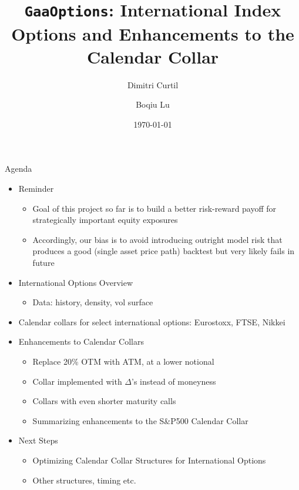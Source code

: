\documentclass{beamer}
\title[{\tt GaaOptions}]{{\tt GaaOptions}: International Index Options and Enhancements to the Calendar Collar}
\author[DC $|$ BL]{Dimitri Curtil  \and Boqiu Lu}
\date{\today}
\begin{document}
\begin{frame}
  \titlepage
\end{frame}

\begin{frame}{Agenda}
\begin{itemize}
\item Reminder
	\begin{itemize}
	\item Goal of this project so far is to build a better risk-reward payoff for strategically important equity exposures
	\item Accordingly, our bias is to avoid introducing outright model risk that produces a good (single asset price path) backtest but very likely fails in future
	\end{itemize}
\item International Options Overview
	\begin{itemize}
	\item Data: history, density, vol surface
	\end{itemize}
\item Calendar collars for select international options: Eurostoxx, FTSE, Nikkei
\item Enhancements to Calendar Collars
	\begin{itemize}
	\item Replace 20\% OTM with ATM, at a lower notional
	\item Collar implemented with $\Delta$'s instead of moneyness
	\item Collars with even shorter maturity calls
	\item Summarizing enhancements to the S\&P500 Calendar Collar
	\end{itemize}

\item Next Steps

	\begin{itemize}
	\item Optimizing Calendar Collar Structures for International Options
	\item Other structures, timing etc.
	\end{itemize}

\end{itemize}
\end{frame}
\end{document}
